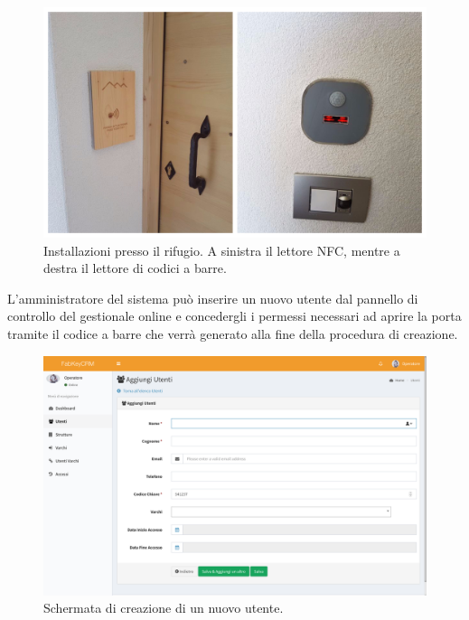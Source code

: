 \begin{figure}[H]
	\begin{center}
	\includegraphics[scale=0.4]{immagini/rifugio.jpg}
	\caption{Installazioni presso il rifugio. A sinistra il lettore NFC, mentre a destra il lettore di codici a barre.}
	\end{center}
\end{figure}

L'amministratore del sistema può inserire un nuovo utente dal pannello di controllo del gestionale online e concedergli i permessi necessari ad aprire la porta tramite il codice a barre che verrà generato alla fine della procedura di creazione.

\begin{figure}[H]
	\begin{center}
	\includegraphics[scale=0.3]{immagini/nuovo_utente.png}
	\caption{Schermata di creazione di un nuovo utente.}
	\end{center}
\end{figure}


